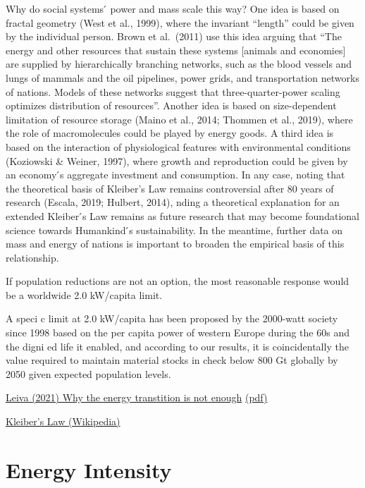 \documentclass[
]{book}
\begin{document}
Why do social systems ́ power and mass scale this way? One idea is based on fractal geometry (West et
al., 1999), where the invariant ``length'' could be given by the individual person. Brown et al.~(2011) use
this idea arguing that ``The energy and other resources that sustain these systems {[}animals and
economies{]} are supplied by hierarchically branching networks, such as the blood vessels and lungs of
mammals and the oil pipelines, power grids, and transportation networks of nations. Models of these
networks suggest that three-quarter-power scaling optimizes distribution of resources''. Another idea is
based on size-dependent limitation of resource storage (Maino et al., 2014; Thommen et al., 2019), where
the role of macromolecules could be played by energy goods. A third idea is based on the interaction of
physiological features with environmental conditions (Koziowski \& Weiner, 1997), where growth and
reproduction could be given by an economy ́s aggregate investment and consumption. In any case,
noting that the theoretical basis of Kleiber's Law remains controversial after 80 years of research (Escala,
2019; Hulbert, 2014), nding a theoretical explanation for an extended Kleiber ́s Law remains as future
research that may become foundational science towards Humankind ́s sustainability. In the meantime,
further data on mass and energy of nations is important to broaden the empirical basis of this
relationship.

If population reductions are not an option, the most reasonable response would be a worldwide 2.0
kW/capita limit.

A speci c limit at 2.0 kW/capita has been
proposed by the 2000-watt society since 1998 based on the per capita power of western Europe during
the 60s and the digni ed life it enabled, and according to our results, it is coincidentally the value required
to maintain material stocks in check below 800 Gt globally by 2050 given expected population levels.

\href{https://www.researchsquare.com/article/rs-66396/v2}{Leiva (2021) Why the energy transtition is not enough}
\href{pdf/Leiva_2021_Transition_not_enough.pdf}{(pdf)}

\href{https://en.wikipedia.org/wiki/Kleiber\%27s_law}{Kleiber's Law (Wikipedia)}

\hypertarget{energy-intensity}{%
\chapter{Energy Intensity}\label{energy-intensity}}
\end{document}

